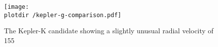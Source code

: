 
\begin{figure*}[tb!]
   \centering
   \texttt{[image: \\plotdir /kepler-g-comparison.pdf]} 

   \caption{The Kepler-K candidate showing a slightly unusual radial velocity of 155\kms}
   \label{fig:kepler-g}
\end{figure*}


